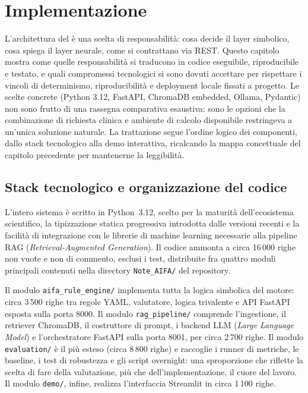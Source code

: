 
\chapter{Implementazione}
\label{ch:implementazione}

L'architettura del  è una scelta di responsabilità:
cosa decide il layer simbolico, cosa spiega il layer neurale, come si
contrattano via REST. Questo capitolo mostra come quelle responsabilità si
traducono in codice eseguibile, riproducibile e testato, e quali compromessi
tecnologici si sono dovuti accettare per rispettare i vincoli di
determinismo, riproducibilità e deployment locale fissati a progetto. Le
scelte concrete (Python 3.12, FastAPI, ChromaDB embedded, Ollama, Pydantic)
non sono frutto di una rassegna comparativa esaustiva: sono le opzioni
che la combinazione di richiesta clinica e ambiente di calcolo disponibile
restringeva a un'unica soluzione naturale. La trattazione segue l'ordine
logico dei componenti, dallo stack tecnologico alla demo interattiva,
ricalcando la mappa concettuale del capitolo precedente per mantenerne la
leggibilità.

\section{Stack tecnologico e organizzazione del codice}
\label{sec:stack}

L'intero sistema è scritto in Python~3.12, scelto per la maturità
dell'ecosistema scientifico, la tipizzazione statica progressiva introdotta
dalle versioni recenti e la facilità di integrazione con le librerie di
machine learning necessarie alla pipeline RAG (\emph{Retrieval-Augmented Generation}). Il codice ammonta
a circa 16\,000 righe non vuote e non di commento, esclusi i test,
distribuite fra quattro moduli principali contenuti
nella directory \texttt{Note\_AIFA/} del repository.

Il modulo \texttt{aifa\_rule\_engine/} implementa tutta la logica simbolica
del motore: circa 3\,500 righe tra regole YAML, valutatore, logica trivalente
e API FastAPI~\cite{fastapi} esposta sulla porta 8000. Il modulo
\texttt{rag\_pipeline/} comprende l'ingestione, il retriever ChromaDB, il
costruttore di prompt, i backend LLM (\emph{Large Language Model}) e l'orchestratore FastAPI sulla porta
8001, per circa 2\,700 righe. Il modulo \texttt{evaluation/} è il più esteso
(circa 8\,800 righe) e raccoglie i runner di metriche, le baseline, i test di
robustezza e gli script overnight: una sproporzione che riflette la scelta di
fare della valutazione, più che dell'implementazione, il cuore del lavoro.
Il modulo \texttt{demo/}, infine, realizza l'interfaccia Streamlit in
circa 1\,100 righe.

